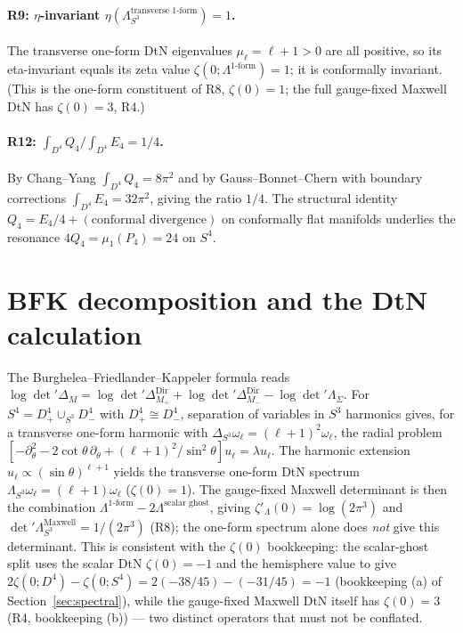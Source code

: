 \documentclass[11pt,a4paper]{article}
\theoremstyle{plain}
\theoremstyle{definition}
\theoremstyle{remark}
\begin{document}
\paragraph{R9: $\eta$-invariant $\eta(\Lambda_{S^3}^{\text{transverse 1-form}}) = 1$.}
The transverse one-form DtN eigenvalues $\mu_\ell = \ell+1 > 0$ are all positive, so its
eta-invariant equals its zeta value $\zeta(0;\Lambda^{\text{1-form}}) = 1$; it is conformally
invariant. (This is the one-form constituent of R8, $\zeta(0)=1$; the full gauge-fixed Maxwell
DtN has $\zeta(0)=3$, R4.)

\paragraph{R12: $\int_{D^4} Q_4 / \int_{D^4} E_4 = 1/4$.}
By Chang--Yang $\int_{D^4} Q_4 = 8\pi^2$ and by Gauss--Bonnet--Chern with boundary corrections
$\int_{D^4} E_4 = 32\pi^2$, giving the ratio $1/4$. The structural identity
$Q_4 = E_4/4 + (\text{conformal divergence})$ on conformally flat manifolds underlies the
resonance $4Q_4 = \mu_1(P_4) = 24$ on $S^4$.

\section{BFK decomposition and the DtN calculation}
\label{sec:bfk}
The Burghelea--Friedlander--Kappeler formula reads
$\log\det{}'\Delta_M = \log\det{}'\Delta_{M_+}^{\mathrm{Dir}} + \log\det{}'\Delta_{M_-}^{\mathrm{Dir}}
 - \log\det{}'\Lambda_\Sigma$. For $S^4 = D^4_+ \cup_{S^3} D^4_-$ with $D^4_+ \cong D^4_-$,
separation of variables in $S^3$ harmonics gives, for a transverse one-form harmonic with
$\Delta_{S^3}\omega_\ell = (\ell+1)^2\omega_\ell$, the radial problem
$[-\partial_\theta^2 - 2\cot\theta\,\partial_\theta + (\ell+1)^2/\sin^2\theta]u_\ell = \lambda u_\ell$.
The harmonic extension $u_\ell \propto (\sin\theta)^{\ell+1}$ yields the transverse one-form DtN
spectrum $\Lambda_{S^3}\omega_\ell = (\ell+1)\omega_\ell$ ($\zeta(0)=1$). The gauge-fixed Maxwell
determinant is then the combination $\Lambda^{\text{1-form}} - 2\Lambda^{\text{scalar ghost}}$,
giving $\zeta'_\Lambda(0) = \log(2\pi^3)$ and $\det{}'\Lambda_{S^3}^{\mathrm{Maxwell}} = 1/(2\pi^3)$
(R8); the one-form spectrum alone does \emph{not} give this determinant. This is consistent with the
$\zeta(0)$ bookkeeping: the scalar-ghost split uses the scalar DtN $\zeta(0)=-1$ and the
hemisphere value to give $2\zeta(0;D^4) - \zeta(0;S^4) = 2(-38/45) - (-31/45) = -1$
(bookkeeping (a) of Section~\ref{sec:spectral}), while the gauge-fixed Maxwell DtN itself has
$\zeta(0)=3$ (R4, bookkeeping (b)) --- two distinct operators that must not be conflated.
\end{document}
